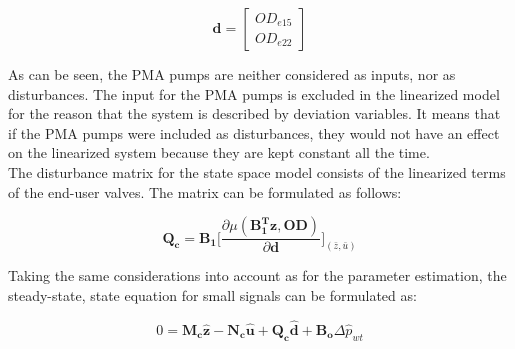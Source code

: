\begin{equation}
\bm{d} =
\begin{bmatrix} 
OD_{e15} \\
OD_{e22} 
\label{disturbancevector_control}
\end{bmatrix} 
\end{equation}

%
%
%
As can be seen, the PMA pumps are neither considered as inputs, nor as disturbances. The input for the PMA pumps is excluded in the linearized model for the reason that the system is described by deviation variables. It means that if the PMA pumps were included as disturbances, they would not have an effect on the linearized system because they are kept constant all the time. 
\\
The disturbance matrix for the state space model consists of the linearized terms of the end-user valves. The matrix can be formulated as follows: 

\begin{equation}
  \bm{Q_c} = \bm{B_1} \bigg[ \frac{\partial{\mu(\bm{{B_1^{T}}}\bm{z}, \bm{OD})}}{{\partial{\bm{d}}}}  \bigg]_{(\bar{z}, \bar{u})}  
\label{disturbance_matrix}
\end{equation}

Taking the same considerations into account as for the parameter estimation, the steady-state, state equation for small signals can be formulated as: 

 \begin{equation}
 0 = \bm{M_c} \bm{\hat{z}} - \bm{N_c} \bm{\hat{u}} + \bm{Q_c} \bm{\hat{d}} + \bm{B_o} \Delta \hat{p}_{wt}    
 \label{statespace_control_sys}
\end{equation}

